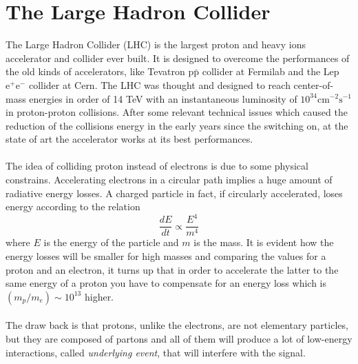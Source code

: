 \chapter{The Large Hadron Collider}
\label{capitolo_2}
The Large Hadron Collider (LHC) is the largest proton and heavy ions accelerator and collider ever built. It is designed to overcome the performances of the old kinds of accelerators, like Tevatron $\text{p}\bar{\text{p}}$ collider at Fermilab and the Lep $\text{e}^+\text{e}^-$ collider at Cern. The LHC was thought and designed to reach center-of-mass energies in order of 14 TeV with an instantaneous luminosity of $10^{34} \text{cm}^{-2}\text{s}^{-1}$ in proton-proton collisions. After some relevant technical issues which caused the reduction of the collisions energy in the early years since the switching on, at the state of art the accelerator works at its best performances.
\\\\
The idea of colliding proton instead of electrons is due to some physical constrains. Accelerating electrons in a circular path implies a huge amount of radiative energy losses. A charged particle in fact, if circularly accelerated, loses energy according to the relation\cite{jackson_classical_1999}
\begin{equation}
\frac{dE}{dt} \propto \frac{E^4}{m^4}
\end{equation}
where $E$ is the energy of the particle and $m$ is the mass. It is evident how the energy losses will be smaller for high masses and comparing the values for a proton and an electron, it turns up that in order to accelerate the latter to the same energy of a proton you have to compensate for an energy loss which is $(m_p / m_e) \sim 10^{13}$ higher.
\\\\
The draw back is that protons, unlike the electrons, are not elementary particles, but they are composed of partons and all of them will produce a lot of low-energy interactions, called \emph{underlying event}, that will interfere with the signal.

